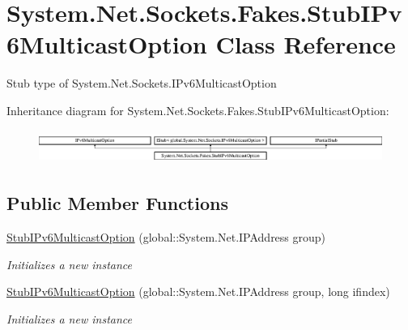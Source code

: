 \hypertarget{class_system_1_1_net_1_1_sockets_1_1_fakes_1_1_stub_i_pv6_multicast_option}{\section{System.\-Net.\-Sockets.\-Fakes.\-Stub\-I\-Pv6\-Multicast\-Option Class Reference}
\label{class_system_1_1_net_1_1_sockets_1_1_fakes_1_1_stub_i_pv6_multicast_option}
}


Stub type of System.\-Net.\-Sockets.\-I\-Pv6\-Multicast\-Option 


Inheritance diagram for System.\-Net.\-Sockets.\-Fakes.\-Stub\-I\-Pv6\-Multicast\-Option\-:\begin{figure}[H]
\begin{center}
\leavevmode
\includegraphics[height=1.107814cm]{class_system_1_1_net_1_1_sockets_1_1_fakes_1_1_stub_i_pv6_multicast_option}
\end{center}
\end{figure}
\subsection*{Public Member Functions}
\begin{DoxyCompactItemize}
\item 
\hyperlink{class_system_1_1_net_1_1_sockets_1_1_fakes_1_1_stub_i_pv6_multicast_option_ac498ac1ae8aa3cfce0078d3e535b6179}{Stub\-I\-Pv6\-Multicast\-Option} (global\-::\-System.\-Net.\-I\-P\-Address group)
\begin{DoxyCompactList}\small\item\em Initializes a new instance\end{DoxyCompactList}\item 
\hyperlink{class_system_1_1_net_1_1_sockets_1_1_fakes_1_1_stub_i_pv6_multicast_option_acb2e530e00d3bbb0281bb05bb6a1d248}{Stub\-I\-Pv6\-Multicast\-Option} (global\-::\-System.\-Net.\-I\-P\-Address group, long ifindex)
\begin{DoxyCompactList}\small\item\em Initializes a new instance\end{DoxyCompactList}\end{DoxyCompactItemize}
